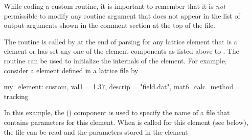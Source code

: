 While coding a custom routine, it is important to remember that it is
{\em not} permissible to modify any routine argument that does not
appear in the list of output arguments shown in the comment section at
the top of the file.

The  routine is called by
 at the end of parsing for any
lattice element that is a  element or has set any one of
the element components as listed above to . The
 routine can be used to initialize the internals of
the element. For example, consider a  element defined in a
lattice file by
\begin{example}
  my_element: custom, val1 = 1.37, descrip = "field.dat", mat6_calc_method = tracking
\end{example}
In this example, the  () component is used
to specify the name of a file that contains parameters for this
element. When  is called for this element (see below),
the file can be read and the parameters stored in the element
